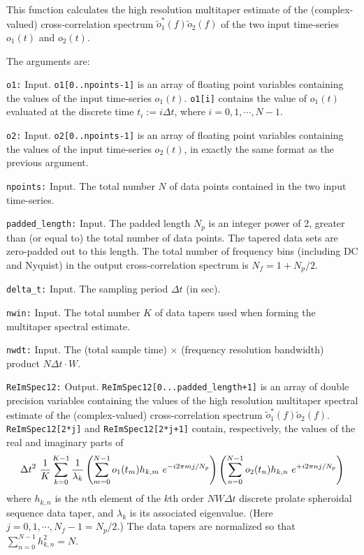 This function calculates the high resolution multitaper estimate 
of the (complex-valued) cross-correlation spectrum
$\tilde o_1^*(f)\tilde o_2(f)$ of the two input time-series 
$o_1(t)$ and $o_2(t)$.

The arguments are:
\begin{description}
\item{\tt o1:} Input. 
{\tt o1[0..npoints-1]} is an array of floating point variables containing 
the values of the input time-series $o_1(t)$.
{\tt o1[i]} contains the value of $o_1(t)$ evaluated at the discrete time
$t_i:=i\Delta t$, where $i=0,1,\cdots,N-1$.
\item{\tt o2:} Input. 
{\tt o2[0..npoints-1]} is an array of floating point variables containing 
the values of the input time-series $o_2(t)$,
in exactly the same format as the previous argument.
\item{\tt npoints:} Input. 
The total number $N$ of data points contained in the two input time-series.
\item{\tt padded\_length:} Input.  
The padded length $N_p$ is an integer power of 2, greater than 
(or equal to) the total number of data points.
The tapered data sets are zero-padded out to this length.
The total number of frequency bins (including DC and Nyquist) in the output 
cross-correlation spectrum is $N_f=1+N_p/2$.
\item{\tt delta\_t:}  Input.  
The sampling period $\Delta t$ (in sec).
\item{\tt nwin:} Input.  
The total number $K$ of data tapers used when forming the multitaper 
spectral estimate.
\item{\tt nwdt:} Input.  
The (total sample time) $\times$ (frequency  resolution bandwidth) product 
$N\Delta t\cdot W$.
\item{\tt ReImSpec12:} Output.  
{\tt ReImSpec12[0...padded\_length+1]} is an array of double precision 
variables
containing the values of the high resolution multitaper spectral estimate
of the (complex-valued) cross-correlation spectrum 
$\tilde o_1^*(f)\tilde o_2(f)$.
{\tt ReImSpec12[2*j]} and {\tt ReImSpec12[2*j+1]} contain, respectively, the 
values of the real and imaginary parts of
%
\begin{equation}
\Delta t^2\ {1\over K}\sum_{k=0}^{K-1}{1\over \lambda_k}
\left(\sum_{m=0}^{N-1} o_1(t_m) h_{k,m}\ e^{-i2\pi m j/N_p}\right) 
\left(\sum_{n=0}^{N-1} o_2(t_n) h_{k,n}\ e^{+i2\pi n j/N_p}\right)
\end{equation}
%
where $h_{k,n}$ is the $n$th element of 
the $k$th order $NW\Delta t$ discrete prolate spheroidal sequence data
taper, and $\lambda_k$ is its associated eigenvalue.
(Here $j=0,1,\cdots,N_f-1=N_p/2$.)
The data tapers are normalized so that $\sum_{n=0}^{N-1} h_{k,n}^2=N$.
\end{description}


